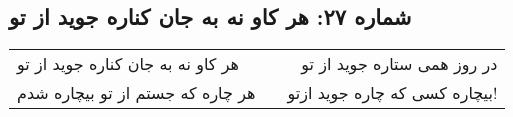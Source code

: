 \begin{center}
\section*{شماره ۲۷: هر کاو نه به جان کناره جوید از تو}
\label{sec:027}
\begin{longtable}{l p{0.5cm} r}
هر کاو نه به جان کناره جوید از تو
&&
در روز همی ستاره جوید از تو
\\
هر چاره که جستم از تو بیچاره شدم
&&
بیچاره کسی که چاره جوید ازتو!
\\
\end{longtable}
\end{center}
